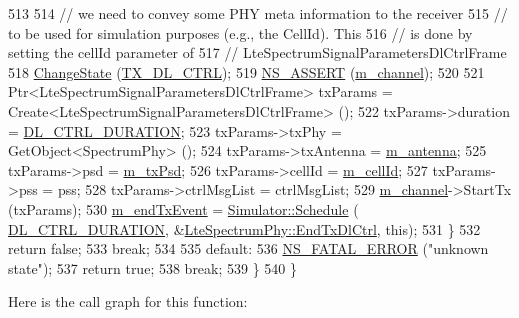 \begin{DoxyCode}
513       
514       \textcolor{comment}{// we need to convey some PHY meta information to the receiver}
515       \textcolor{comment}{// to be used for simulation purposes (e.g., the CellId). This}
516       \textcolor{comment}{// is done by setting the cellId parameter of}
517       \textcolor{comment}{// LteSpectrumSignalParametersDlCtrlFrame}
518       \hyperlink{classns3_1_1LteSpectrumPhy_a64a105b7c580b3d6dc5cd4b97d1223d9}{ChangeState} (\hyperlink{classns3_1_1LteSpectrumPhy_a52ce2cf9b4846807449c50399f6b8000a901bd52b34b4ada4dd781d65c0061fe9}{TX\_DL\_CTRL});
519       \hyperlink{assert_8h_a6dccdb0de9b252f60088ce281c49d052}{NS\_ASSERT} (\hyperlink{classns3_1_1LteSpectrumPhy_a83821e104a67268a379c06cfe65f7417}{m\_channel});
520 
521       Ptr<LteSpectrumSignalParametersDlCtrlFrame> txParams = Create<LteSpectrumSignalParametersDlCtrlFrame>
       ();
522       txParams->duration = \hyperlink{namespacens3_a9f07caa6366012f773f086f0b8459e16}{DL\_CTRL\_DURATION};
523       txParams->txPhy = GetObject<SpectrumPhy> ();
524       txParams->txAntenna = \hyperlink{classns3_1_1LteSpectrumPhy_a99c269c50198172fecd23b2eab9da193}{m\_antenna};
525       txParams->psd = \hyperlink{classns3_1_1LteSpectrumPhy_a5db966e9422290886f779dbbf1cbd146}{m\_txPsd};
526       txParams->cellId = \hyperlink{classns3_1_1LteSpectrumPhy_a996732fedbe320aedd9d2def1fc6e3c7}{m\_cellId};
527       txParams->pss = pss;
528       txParams->ctrlMsgList = ctrlMsgList;
529       \hyperlink{classns3_1_1LteSpectrumPhy_a83821e104a67268a379c06cfe65f7417}{m\_channel}->StartTx (txParams);
530       \hyperlink{classns3_1_1LteSpectrumPhy_a95011c60fa2c99a9295f7ab4420014c0}{m\_endTxEvent} = \hyperlink{classns3_1_1Simulator_a671882c894a08af4a5e91181bf1eec13}{Simulator::Schedule} (
      \hyperlink{namespacens3_a9f07caa6366012f773f086f0b8459e16}{DL\_CTRL\_DURATION}, &\hyperlink{classns3_1_1LteSpectrumPhy_acc36ac9ddcc5daff49b55f106b97856c}{LteSpectrumPhy::EndTxDlCtrl}, \textcolor{keyword}{this});
531     \}
532     \textcolor{keywordflow}{return} \textcolor{keyword}{false};
533     \textcolor{keywordflow}{break};
534     
535     \textcolor{keywordflow}{default}:
536       \hyperlink{group__fatal_ga5131d5e3f75d7d4cbfd706ac456fdc85}{NS\_FATAL\_ERROR} (\textcolor{stringliteral}{"unknown state"});
537       \textcolor{keywordflow}{return} \textcolor{keyword}{true};
538       \textcolor{keywordflow}{break};
539   \}
540 \}
\end{DoxyCode}


Here is the call graph for this function\+:


